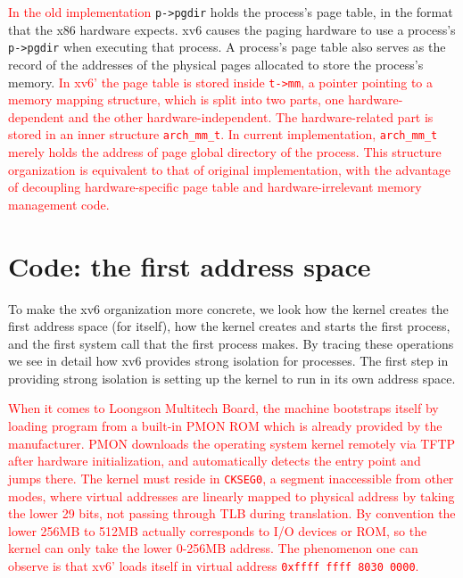 \documentclass{report}
\begin{document}
	\textcolor{red}{In the old implementation} \texttt{p->pgdir} holds the process's page table, 
	in the format that the x86 hardware expects. xv6 causes the paging hardware to use a 
	process's \texttt{p->pgdir} when executing
	that process. A process's page table also serves as the record of the addresses of the
	physical pages allocated to store the process's memory.  \textcolor{red}{
		In xv6' the page table is stored inside \texttt{t->mm}, a pointer pointing to a memory 
		mapping structure, which is split into two parts, one hardware-dependent and the other
		hardware-independent.  The hardware-related part is stored in an inner structure
		 \texttt{arch\_mm\_t}.  In current implementation,
		\texttt{arch\_mm\_t} merely holds the address of page global directory of the process.
		This structure organization is equivalent to that of original implementation, with the
		advantage of decoupling hardware-specific page table and hardware-irrelevant memory
		management code.
	}
	
	\section{Code: the first address space}
	To make the xv6 organization more concrete, we look how the kernel creates the first
	address space (for itself), how the kernel creates and starts the first process, and the
	first system call that the first process makes. By tracing these operations we see in detail
	how xv6 provides strong isolation for processes. The first step in providing strong 
	isolation is setting up the kernel to run in its own address space.
	
	\textcolor{red}{
		When it comes to Loongson Multitech Board, the machine bootstraps
		itself by loading program from a built-in PMON ROM which is already provided by the
		manufacturer.  PMON downloads the operating system kernel remotely via TFTP after hardware
		initialization, and automatically detects the entry point and jumps there.  The kernel must
		reside in \texttt{CKSEG0}, a segment inaccessible from other modes, 
		where virtual addresses are linearly mapped to physical address by taking
		the lower 29 bits, not passing through TLB during translation.  By convention the
		lower 256MB to 512MB actually corresponds to I/O devices or ROM, so the kernel can only
		take the lower 0-256MB address.  The phenomenon one can observe is that xv6' loads itself
		in virtual address \texttt{0xffff ffff 8030 0000}.
	}
	
\end{document}
